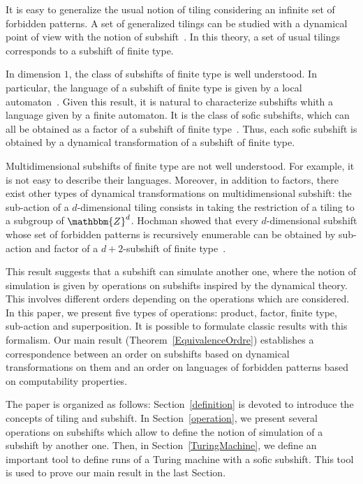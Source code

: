 \documentclass[proceedings]{stacs}
\theoremstyle{plain}\newtheorem{satz}[thm]{Satz}
\theoremstyle{definition}\newtheorem{crucial}[thm]{Crucial Definition}
\newcommand{\Z}{\mathbbm{Z}}
\begin{document}
It is easy to generalize the usual notion of tiling considering an infinite set of forbidden patterns. A set of generalized tilings can be studied with a dynamical point of view with the notion of subshift~\cite{lind1995isd,kitchens1998sd}. In this theory, a set of usual tilings corresponds to a subshift of finite type. 

In dimension $1$, the class of subshifts of finite type is well understood. In particular, the language of a subshift of finite type is given by a local automaton~\cite{beal1993cs}. Given this result, it is natural to characterize subshifts whith a language given by a finite automaton. It is the class of sofic subshifts, which can all be obtained as a factor of a subshift of finite type~\cite{lind1995isd}. Thus, each sofic subshift is obtained by a dynamical transformation of a subshift of finite type. 

Multidimensional subshifts of finite type are not well understood. For example, it is not easy to describe their languages. Moreover, in addition to factors, there exist other types of dynamical transformations on multidimensional subshift: the sub-action of a $d$-dimensional tiling consists in taking the restriction of a tiling to a subgroup of $\Z^d$. Hochman showed that every $d$-dimensional subshift whose set of forbidden patterns is recursively enumerable can be obtained by sub-action and factor of a $d+2$-subshift of finite type~\cite{hochman2007drp}. 

This result suggests that a subshift can simulate another one, where the notion of simulation is given by operations on subshifts inspired by the dynamical theory. This involves different orders depending on the operations which are considered. In this paper, we present five types of operations: product, factor, finite type, sub-action and superposition. It is possible to formulate classic results with this formalism. Our main result (Theorem~\ref{EquivalenceOrdre}) establishes a correspondence between an order on subshifts based on dynamical transformations on them and an order on languages of forbidden patterns based on computability properties. 

The paper is organized as follows: Section~\ref{definition} is devoted to introduce the concepts of tiling and subshift. In Section~\ref{operation}, we present several operations on subshifts which allow to define the notion of simulation of a subshift by another one. Then, in Section~\ref{TuringMachine}, we define an important tool to define runs of a Turing machine with a sofic subshift. This tool is used to prove our main result in the last Section.
\end{document}
